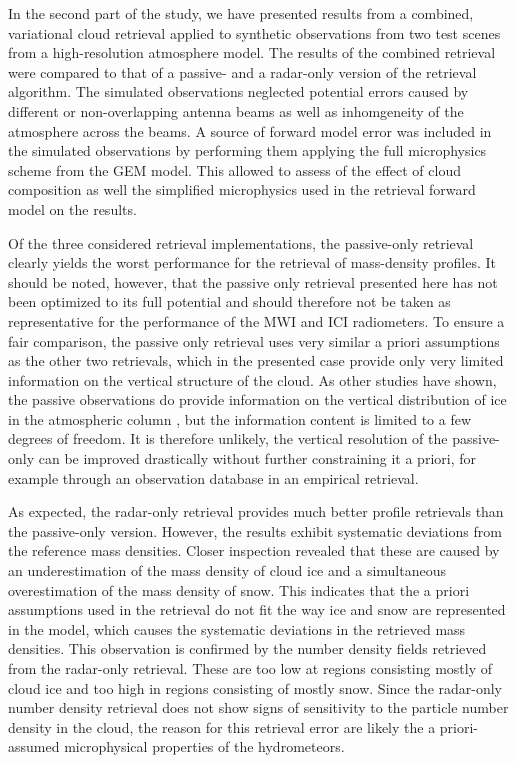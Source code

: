 \documentclass[journal abbreviation, manuscript]{copernicus}
\begin{document}
In the second part of the study, we have presented results from a combined,
variational cloud retrieval applied to synthetic observations from two test
scenes from a high-resolution atmosphere model. The results of the combined
retrieval were compared to that of a passive- and a radar-only version of the
retrieval algorithm. The simulated observations neglected potential errors
caused by different or non-overlapping antenna beams as well as inhomgeneity of
the atmosphere across the beams. A source of forward model error was included in
the simulated observations by performing them applying the full microphysics
scheme from the GEM model. This allowed to assess of the effect of cloud
composition as well the simplified microphysics used in the retrieval forward
model on the results.

Of the three considered retrieval implementations, the passive-only retrieval
clearly yields the worst performance for the retrieval of mass-density profiles.
It should be noted, however, that the passive only retrieval presented here has
not been optimized to its full potential and should therefore not be taken as
representative for the performance of the MWI and ICI radiometers. To ensure a
fair comparison, the passive only retrieval uses very similar a priori
assumptions as the other two retrievals, which in the presented case provide
only very limited information on the vertical structure of the cloud. As other
studies have shown, the passive observations do provide information on the
vertical distribution of ice in the atmospheric column \citep{wang17,
  grutzun18}, but the information content is limited to a few degrees of
freedom. It is therefore unlikely, the vertical resolution of the passive-only
can be improved drastically without further constraining it a priori, for
example through an observation database in an empirical retrieval.

As expected, the radar-only retrieval provides much better profile retrievals
than the passive-only version. However, the results exhibit systematic
deviations from the reference mass densities. Closer inspection revealed that
these are caused by an underestimation of the mass density of cloud ice and a
simultaneous overestimation of the mass density of snow. This indicates that the
a priori assumptions used in the retrieval do not fit the way ice and snow are
represented in the model, which causes the systematic deviations in the
retrieved mass densities. This observation is confirmed by the number density
fields retrieved from the radar-only retrieval. These are too low at regions
consisting mostly of cloud ice and too high in regions consisting of mostly
snow. Since the radar-only number density retrieval does not show signs of
sensitivity to the particle number density in the cloud, the reason for this
retrieval error are likely the a priori-assumed microphysical properties of the
hydrometeors.
\end{document}
